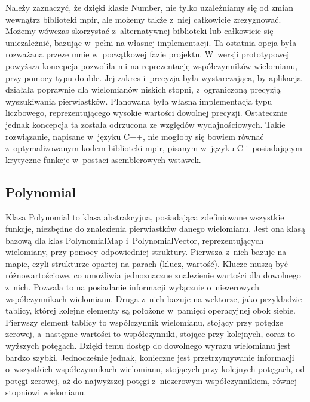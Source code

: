Należy zaznaczyć, że dzięki klasie Number, nie tylko uzależniamy się od zmian wewnątrz biblioteki mpir, ale możemy także z~niej całkowicie zrezygnować. Możemy wówczas skorzystać z~alternatywnej biblioteki lub całkowicie się uniezależnić, bazując w~pełni na własnej implementacji. Ta ostatnia opcja była rozważana przeze mnie w~początkowej fazie projektu. W~wersji prototypowej powyższa koncepcja pozwoliła mi na reprezentację współczynników wielomianu, przy pomocy typu double. Jej zakres i~precyzja była wystarczająca, by aplikacja działała poprawnie dla wielomianów niskich stopni, z~ograniczoną precyzją wyszukiwania pierwiastków. Planowana była własna implementacja typu liczbowego, reprezentującego wysokie wartości dowolnej precyzji. Ostatecznie jednak koncepcja ta została odrzucona ze względów wydajnościowych. Takie rozwiązanie, napisane w~języku C++, nie mogłoby się bowiem równać z~optymalizowanym kodem biblioteki mpir, pisanym w~języku C i~posiadającym krytyczne funkcje w~postaci asemblerowych wstawek.

\subsection{Polynomial}

Klasa Polynomial to klasa abstrakcyjna, posiadająca zdefiniowane wszystkie funkcje, niezbędne do znalezienia pierwiastków danego wielomianu. Jest ona klasą bazową dla klas PolynomialMap i~PolynomialVector, reprezentujących wielomiany, przy pomocy odpowiedniej struktury. Pierwsza z~nich bazuje na mapie, czyli strukturze opartej na parach (klucz, wartość). Klucze muszą być różnowartościowe, co umożliwia jednoznaczne znalezienie wartości dla dowolnego z~nich. Pozwala to na posiadanie informacji wyłącznie o~niezerowych współczynnikach wielomianu. Druga z~nich bazuje na wektorze, jako przykładzie tablicy, której kolejne elementy są położone w~pamięci operacyjnej obok siebie. Pierwszy element tablicy to współczynnik wielomianu, stojący przy potędze zerowej, a~następne wartości to współczynniki, stojące przy kolejnych, coraz to wyższych potęgach. Dzięki temu dostęp do dowolnego wyrazu wielomianu jest bardzo szybki. Jednocześnie jednak, konieczne jest przetrzymywanie informacji o~wszystkich współczynnikach wielomianu, stojących przy kolejnych potęgach, od potęgi zerowej, aż do najwyższej potęgi z~niezerowym współczynnikiem, równej stopniowi wielomianu.

